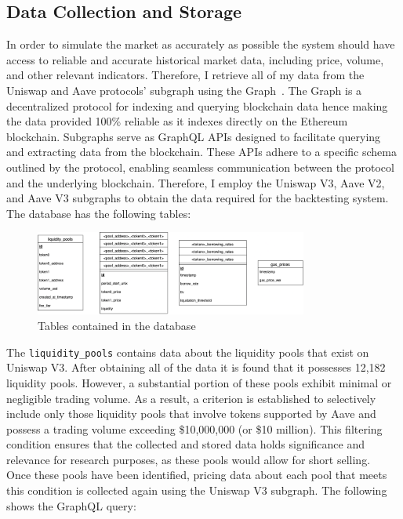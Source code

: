\subsection{Data Collection and Storage}
In order to simulate the market as accurately as possible the system should have access to reliable and accurate historical market data, including price, volume, and other relevant indicators. Therefore, I retrieve all of my data from the Uniswap and Aave protocols' subgraph using the Graph~\cite{noauthor_graph_nodate}. The Graph is a decentralized protocol for indexing and querying blockchain data hence making the data provided 100\% reliable as it indexes directly on the Ethereum blockchain. Subgraphs serve as GraphQL APIs designed to facilitate querying and extracting data from the blockchain. These APIs adhere to a specific schema outlined by the protocol, enabling seamless communication between the protocol and the underlying blockchain. Therefore, I employ the Uniswap V3, Aave V2, and Aave V3 subgraphs to obtain the data required for the backtesting system.
\\[5mm]
The database has the following tables:
\begin{figure}[!htb]
    \centering
    \includegraphics[width=0.8\textwidth]{project/Images/database_tables.png}
    \caption{Tables contained in the database \label{fig:database}}
\end{figure}
The \texttt{liquidity\_pools} contains data about the liquidity pools that exist on Uniswap V3. After obtaining all of the data it is found that it possesses 12,182 liquidity pools. However, a substantial portion of these pools exhibit minimal or negligible trading volume. As a result, a criterion is established to selectively include only those liquidity pools that involve tokens supported by Aave and possess a trading volume exceeding \$10,000,000 (or \$10 million). This filtering condition ensures that the collected and stored data holds significance and relevance for research purposes, as these pools would allow for short selling.
\\[5mm]
Once these pools have been identified, pricing data about each pool that meets this condition is collected again using the Uniswap V3 subgraph. The following shows the GraphQL query:
